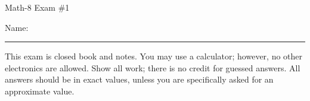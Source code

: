 \documentclass[letterpaper,12pt,fleqn]{article}
\begin{document}
\begin{center}
\Large Math-8 Exam \#1
\end{center}

\vspace{0.5in}

Name: \rule{4in}{1pt}

\vspace{0.5in}

This exam is closed book and notes. You may use a calculator; however, no other
electronics are allowed. Show all work; there is no credit for guessed
answers. All answers should be in exact values, unless you are specifically
asked for an approximate value.

\vspace{0.5in}

\newcommand{\fillin}{\rule[-10pt]{2in}{1pt}}
\newcommand{\sfillin}{\rule[-10pt]{0.5in}{1pt}}
\end{document}
